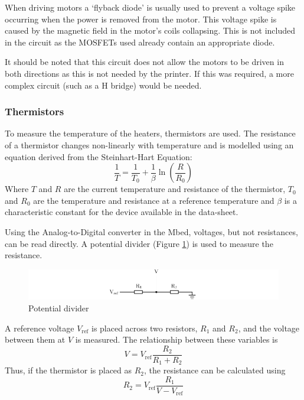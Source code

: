 				When driving motors a `flyback diode' is usually used to prevent a
				voltage spike occurring when the power is removed from the motor. This
				voltage spike is caused by the magnetic field in the motor's coils
				collapsing. This is not included in the circuit as the MOSFETs used
				already contain an appropriate diode.
				
				It should be noted that this circuit does not allow the motors to be
				driven in both directions as this is not needed by the printer. If this
				was required, a more complex circuit (such as a H bridge) would be
				needed.
			
			\subsubsection{Thermistors}
				
				To measure the temperature of the heaters, thermistors are used. The
				resistance of a thermistor changes non-linearly with temperature and is
				modelled using an equation derived from the Steinhart-Hart
				Equation\cite{Steinhart1968497}:
				\begin{equation}
					\frac{1}{T} = \frac{1}{T_0} + \frac{1}{\beta} \ln \left( \frac{R}{R_0} \right)
					\label{equ:steinhart}
				\end{equation}
				Where $T$ and $R$ are the current temperature and resistance of the
				thermistor, $T_0$ and $R_0$ are the temperature and resistance at a
				reference temperature and $\beta$ is a characteristic constant for the
				device available in the data-sheet.
				
				
				Using the Analog-to-Digital converter in the Mbed, voltages, but not
				resistances, can be read directly. A potential divider (Figure
				\ref{fig:potentialDiv}) is used to measure the resistance.
				\begin{figure}
					\includegraphics[width=1\textwidth]{diagrams/potentialDiv.pdf}
					\caption{Potential divider}
					\label{fig:potentialDiv}
				\end{figure}
				A reference voltage $V_\textrm{ref}$ is placed across two resistors,
				$R_1$ and $R_2$, and the voltage between them at $V$ is measured. The
				relationship between these variables is
				\begin{equation}
					V = V_\textrm{ref} \frac{R_2}{R_1 + R_2}
				\end{equation}
				Thus, if the thermistor is placed as $R_2$, the resistance can be
				calculated using
				\begin{equation}
					R_2 = V_\textrm{ref} \frac{R_1}{V - V_\textrm{ref}}
					\label{equ:potdiv}
				\end{equation}
				
